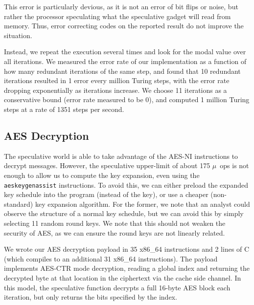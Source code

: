 This error is particularly devious, as it is not an
error of bit flips or noise, but rather the processor speculating what the
speculative gadget will read from memory. Thus, error correcting codes on
the reported result do not improve the situation.


Instead, we
repeat the execution several times and look for the modal value over all
iterations. We measured the
error rate of our implementation as a function of how many redundant iterations
of the same step, and found that 10 redundant iterations resulted in 1 error every
million Turing steps, with the error rate dropping exponentially as iterations
increase. We choose 11 iterations as a conservative bound (error rate measured
to be 0), and computed 1 million Turing steps at a rate of 1351
steps per second.






\subsection{AES Decryption}
\label{subsec:impl-aes}
The speculative world is able to take advantage of the AES-NI instructions to
decrypt messages. However, the speculative upper-limit of about 175 $\mu$~ops is not
enough to allow us to compute the key expansion, even using the
\texttt{aeskeygenassist} instructions. To avoid this, we can either preload the
expanded key schedule into the program (instead of the key), or use a cheaper
(non-standard) key expansion algorithm.
For the former, we note that an analyst
could observe the structure of a normal key schedule,
but we can avoid this by simply selecting 11 random round keys.
We note that
this should not weaken the security of AES, as we can ensure the round keys are
not linearly related.


%

We wrote our AES decryption payload in 35 x86\_64 instructions and 2 lines of C
(which compiles to an additional 31 x86\_64 instructions). The payload
implements AES-CTR mode decryption, reading a global index and returning the
decrypted byte at that location in the ciphertext via the cache side channel.
In this model, the speculative function decrypts a full 16-byte AES block each
iteration, but only returns the bits specified by the index.


